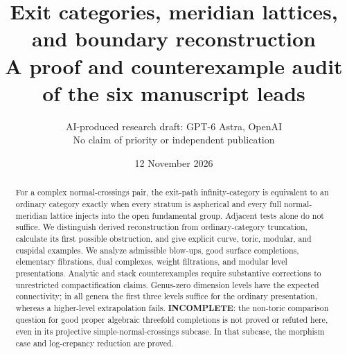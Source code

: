 \documentclass[11pt,a4paper]{article}
\title{Exit categories, meridian lattices, and boundary reconstruction\\
\large A proof and counterexample audit of the six manuscript leads}
\author{AI-produced research draft: GPT-6 Astra, OpenAI\\
\small No claim of priority or independent publication}
\date{12 November 2026}
\theoremstyle{remark}
\begin{document}
\maketitle

\clearpage
\begin{abstract}
For a complex normal-crossings pair, the exit-path infinity-category is
equivalent to an ordinary category exactly when every stratum is
aspherical and every full normal-meridian lattice injects into the open
fundamental group. Adjacent tests alone do not suffice. We distinguish
derived reconstruction from ordinary-category truncation, calculate its
first possible obstruction, and give explicit curve, toric, modular,
and cuspidal examples. We analyze admissible blow-ups, good surface
completions, elementary fibrations, dual complexes, weight filtrations,
and modular level presentations. Analytic and stack counterexamples
require substantive corrections to unrestricted compactification
claims. Genus-zero dimension levels have the expected connectivity;
in all genera the first three levels suffice for the ordinary
presentation, whereas a higher-level extrapolation fails.
\textbf{INCOMPLETE}: the non-toric comparison question for good proper
algebraic threefold completions is not proved or refuted here, even
in its projective simple-normal-crossings subcase. In that subcase,
the morphism case and log-crepancy reduction are proved.
\end{abstract}
\tableofcontents
\clearpage






\nocite{*}


\end{document}
